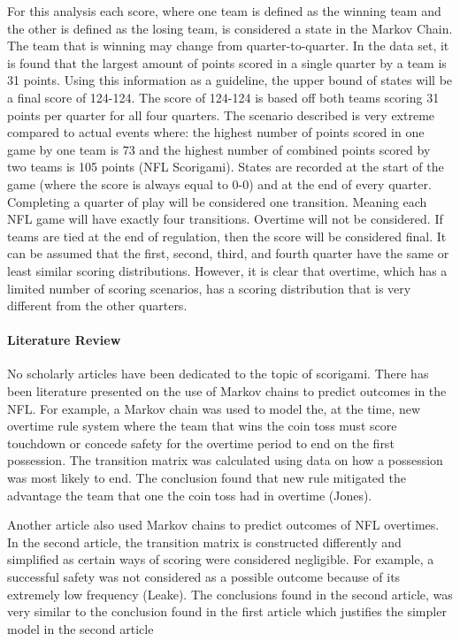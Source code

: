 \documentclass[
]{article}
\let\oldparagraph\paragraph
\renewcommand{\paragraph}[1]{\oldparagraph{#1}\mbox{}}
\begin{document}
For this analysis each score, where one team is defined as the winning
team and the other is defined as the losing team, is considered a state
in the Markov Chain. The team that is winning may change from
quarter-to-quarter. In the data set, it is found that the largest amount
of points scored in a single quarter by a team is 31 points. Using this
information as a guideline, the upper bound of states will be a final
score of 124-124. The score of 124-124 is based off both teams scoring
31 points per quarter for all four quarters. The scenario described is
very extreme compared to actual events where: the highest number of
points scored in one game by one team is 73 and the highest number of
combined points scored by two teams is 105 points (NFL Scorigami).
States are recorded at the start of the game (where the score is always
equal to 0-0) and at the end of every quarter. Completing a quarter of
play will be considered one transition. Meaning each NFL game will have
exactly four transitions. Overtime will not be considered. If teams are
tied at the end of regulation, then the score will be considered final.
It can be assumed that the first, second, third, and fourth quarter have
the same or least similar scoring distributions. However, it is clear
that overtime, which has a limited number of scoring scenarios, has a
scoring distribution that is very different from the other quarters.

\hypertarget{literature-review}{%
\paragraph{Literature Review}\label{literature-review}}

No scholarly articles have been dedicated to the topic of scorigami.
There has been literature presented on the use of Markov chains to
predict outcomes in the NFL. For example, a Markov chain was used to
model the, at the time, new overtime rule system where the team that
wins the coin toss must score touchdown or concede safety for the
overtime period to end on the first possession. The transition matrix
was calculated using data on how a possession was most likely to end.
The conclusion found that new rule mitigated the advantage the team that
one the coin toss had in overtime (Jones).

Another article also used Markov chains to predict outcomes of NFL
overtimes. In the second article, the transition matrix is constructed
differently and simplified as certain ways of scoring were considered
negligible. For example, a successful safety was not considered as a
possible outcome because of its extremely low frequency (Leake). The
conclusions found in the second article, was very similar to the
conclusion found in the first article which justifies the simpler model
in the second article
\end{document}
